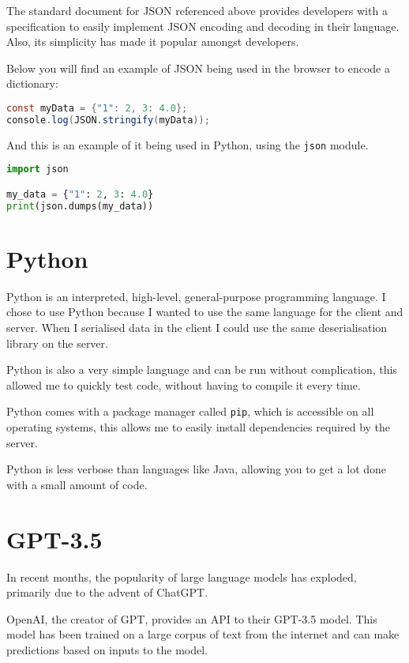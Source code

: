 The standard document for JSON referenced above
provides developers with a specification to easily
implement JSON encoding and decoding in their language.
Also, its simplicity has made it popular amongst developers.

Below you will find an example of JSON being used in the browser to encode a dictionary:

\begin{lstlisting}[language=Java]
const myData = {"1": 2, 3: 4.0};
console.log(JSON.stringify(myData));
\end{lstlisting}

And this is an example of it being used in Python, using the \texttt{json} module.

\begin{lstlisting}[language=Python]
import json

my_data = {"1": 2, 3: 4.0}
print(json.dumps(my_data))
\end{lstlisting}

\section{Python}
Python is an interpreted, high-level, general-purpose programming language.
I chose to use Python because I wanted to use the same language for the client and server.
When I serialised data in the client I could use the same
deserialisation library on the server.

Python is also a very simple language and can be run without complication,
this allowed me to quickly test code, without having to compile it every time.

Python comes with a package manager called \texttt{pip},
which is accessible on all operating systems,
this allows me to easily install dependencies required by the server.

Python is less verbose than languages like Java,
allowing you to get a lot done with a small amount of code.

\section{GPT-3.5}
In recent months, the popularity of large language models has exploded,
primarily due to the advent of ChatGPT.

OpenAI, the creator of GPT, provides an API to their GPT-3.5 model.
This model has been trained on a large corpus of text from the internet
and can make predictions based on inputs to the model.

